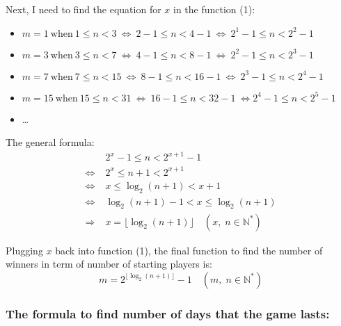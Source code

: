 \documentclass[12pt]{article}
\begin{document}
\noindent Next, I need to find the equation for $x$ in the function (1):
\begin{itemize}
    \item $m=1\ \text{when}\ 1\leqslant n<3\  \Longleftrightarrow\ 2-1\leqslant n<4-1\ 
    \Longleftrightarrow\ 2^1-1\leqslant n<2^2-1$ \par
    
    \item $m=3\ \text{when}\ 3\leqslant n<7\  \Longleftrightarrow\ 4-1\leqslant n<8-1\ 
    \Longleftrightarrow\ 2^2-1\leqslant n<2^3-1$ \par
    
    \item $m=7\ \text{when}\ 7\leqslant n<15\ 
    \Longleftrightarrow\ 8-1\leqslant n<16-1\ 
    \Longleftrightarrow\ 2^3-1\leqslant n<2^4-1$ \par
    
    \item $m=15\ \text{when}\ 15\leqslant n<31\  \Longleftrightarrow\ 16-1\leqslant n<32-1\ 
    \Longleftrightarrow 2^4-1\leqslant n<2^5-1$ \par
    
    \item \dots \par
\end{itemize}


\noindent The general formula: 
\begin{align*}
    &2^x-1\leqslant n<2^{x+1}-1 \\
    \Longleftrightarrow\; &
    2^x\leqslant n+1 <2^{x+1} \\
    \Longleftrightarrow\; &
    x\leqslant \log_2 \left(n+1\right) <x+1 \\
    \Longleftrightarrow\; &
    \log_2 \left(n+1\right)-1 <x \leqslant \log_2 \left(n+1\right) \\
    \Longrightarrow\; & x = \lfloor\log_2\left(n+1\right)\rfloor \quad\left(x,\; n\in \mathbb{N^*} \right)
\end{align*}

\noindent Plugging $x$ back into function (1), the final function to find the number of winners in term of number of starting players is: $$m=2^{ \lfloor\log_2 \left(n+1 \right) \rfloor} -1 \quad \left(m,\; n\in \mathbb{N^*} \right)$$ \par



\subsubsection*{The formula to find number of days that the game lasts:}
    
\end{document}
